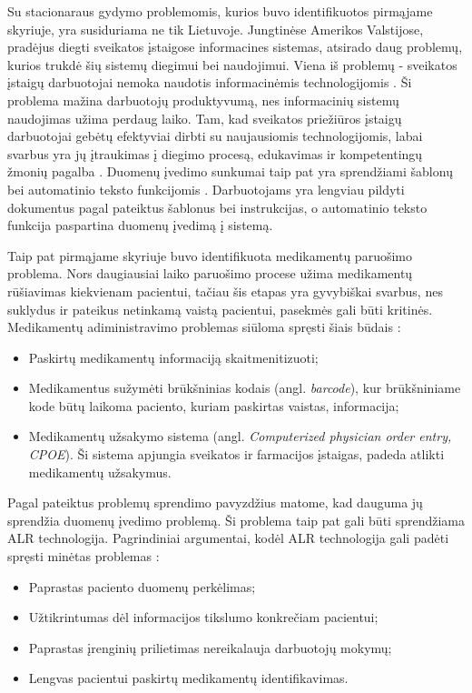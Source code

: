 Su stacionaraus gydymo problemomis, kurios buvo identifikuotos pirmąjame skyriuje, yra susiduriama ne tik Lietuvoje. Jungtinėse Amerikos Valstijose, pradėjus diegti sveikatos įstaigose informacines sistemas, atsirado daug problemų, kurios trukdė šių sistemų diegimui bei naudojimui. Viena iš problemų - sveikatos įstaigų darbuotojai nemoka naudotis informacinėmis technologijomis \cite{Jha2009}. Ši problema mažina darbuotojų produktyvumą, nes informacinių sistemų naudojimas užima perdaug laiko. Tam, kad sveikatos priežiūros įstaigų darbuotojai gebėtų efektyviai dirbti su naujausiomis technologijomis, labai svarbus yra jų įtraukimas į diegimo procesą, edukavimas ir kompetentingų žmonių pagalba \cite{Lorenzi2009}. Duomenų įvedimo sunkumai taip pat yra sprendžiami šablonų bei automatinio teksto funkcijomis \cite{Noblin2013}. Darbuotojams yra lengviau pildyti dokumentus pagal pateiktus šablonus bei instrukcijas, o automatinio teksto funkcija paspartina duomenų įvedimą į sistemą. 

Taip pat pirmąjame skyriuje buvo identifikuota medikamentų paruošimo problema. Nors daugiausiai laiko paruošimo procese užima medikamentų rūšiavimas kiekvienam pacientui, tačiau šis etapas yra gyvybiškai svarbus, nes suklydus ir pateikus netinkamą vaistą pacientui, pasekmės gali būti kritinės. Medikamentų adiministravimo problemas siūloma spręsti šiais būdais \cite{Agrawal2009}:
\begin{itemize}
    \item Paskirtų medikamentų informaciją skaitmenitizuoti;
    \item Medikamentus sužymėti brūkšninias kodais (angl. \textit{barcode}), kur brūkšniniame kode būtų laikoma paciento, kuriam paskirtas vaistas, informacija;
    \item Medikamentų užsakymo sistema (angl. \textit{Computerized physician order entry, CPOE}). Ši sistema apjungia sveikatos ir farmacijos įstaigas, padeda atlikti medikamentų užsakymus.
\end{itemize}

Pagal pateiktus problemų sprendimo pavyzdžius matome, kad dauguma jų sprendžia duomenų įvedimo problemą. Ši problema taip pat gali būti sprendžiama ALR technologija. Pagrindiniai argumentai, kodėl ALR technologija gali padėti spręsti minėtas problemas \cite{forum2}: 
\begin{itemize}
    \item Paprastas paciento duomenų perkėlimas;
    \item Užtikrintumas dėl informacijos tikslumo konkrečiam pacientui;
    \item Paprastas įrenginių prilietimas nereikalauja darbuotojų mokymų;
    \item Lengvas pacientui paskirtų medikamentų identifikavimas.
\end{itemize}